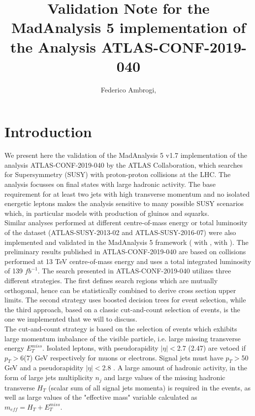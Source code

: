 \documentclass[a4paper,11pt]{article}
\title{{\boldmath Validation Note for the MadAnalysis 5 implementation of the Analysis ATLAS-CONF-2019-040}}
\author[a,]{Federico Ambrogi,\note{Corresponding author.}}
\affiliation[a]{Department of Meteorology and Geophysics, University of Vienna, Vienna, Austria}
\begin{document}
 
	\maketitle
	\flushbottom
	\section{Introduction}
	We present here the validation of the MadAnalysis  5\cite{Dumont:2014tja, Conte:2014zja, Conte:2018vmg} v1.7 implementation of the analysis ATLAS-CONF-2019-040\cite{ATLAS2019vcq} by the ATLAS Collaboration, which searches for Supersymmetry (SUSY) with proton-proton collisions at the LHC. The analysis focusses on final states with large hadronic activity. The base requirement for at least two jets with high transverse momentum and no isolated energetic leptons makes the analysis sensitive to many possible SUSY scenarios which, in particular models with production of gluinos and squarks. 
	\\	
	Similar analyses performed at different centre-of-mass energy or total luminosity of the dataset (ATLAS-SUSY-2013-02\cite{Aad:2014wea} and ATLAS-SUSY-2016-07\cite{Aaboud:2017vwy}) were also implemented and validated in the MadAnalysis 5 framework (\cite{ATLAS-SUSY-2013-02MA5} with \cite{ATLAS-SUSY-2013-02VALIDATION}, \cite{ATLAS-SUSY-2016-07MA5} with \cite{ATLAS-SUSY-2016-07VALIDATION}). The preliminary results published in ATLAS-CONF-2019-040 are based on collisions performed at 13 TeV centre-of-mass energy and uses a total integrated luminosity of 139 $fb^{-1}$. 
	The search presented in ATLAS-CONF-2019-040 utilizes three different strategies. The first defines search regions which are mutually orthogonal, hence can be statistically combined to derive cross section upper limits. The second strategy uses boosted decision trees for event selection, while the third approach, based on a classic cut-and-count selection of events,
	is the one we implemented that we will to discuss. \\
	
	The cut-and-count strategy is based on the selection of events which exhibits large momentum imbalance of the visible particle, i.e. large missing transverse energy $E_T^{miss}$. Isolated leptons, with pseudorapidity $|\eta|<$2.7 (2.47) are vetoed if $p_T>$6(7) GeV respectively for muons or electrons.
	Signal jets must have $p_T>$50 GeV and a pseudorapidity $|\eta|<$2.8 . 
	A large amount of hadronic activity, in the form of large jets multiplicity $n_j$ and large values of the missing hadronic transverse $H_T$ (scalar sum of all signal jets momenta) is required in the events, as well as large values of the "effective mass" variable calculated as $m_{eff}= H_T + E_T^{miss}$.
	\\
	
\end{document}
